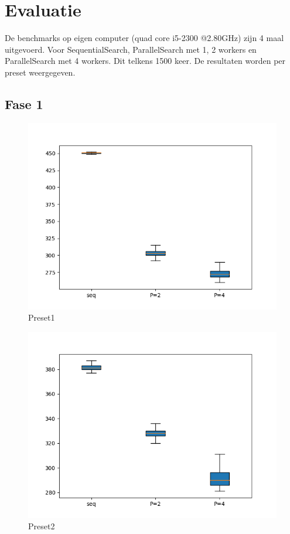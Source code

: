 \documentclass[]{article}
\begin{document}
\section{Evaluatie}
De benchmarks op eigen computer (quad core i5-2300 @2.80GHz) zijn 4 maal uitgevoerd. Voor SequentialSearch, ParallelSearch met 1, 2 workers en ParallelSearch met 4 workers. Dit telkens 1500 keer. De resultaten worden per preset weergegeven.

\subsection{Fase 1}

\begin{figure}
	\centering
	\includegraphics[width=0.7\linewidth]{Preset_1}
	\caption[Preset1]{Preset1}
	\label{fig:preset1}
\end{figure}

\begin{figure}
	\centering
	\includegraphics[width=0.7\linewidth]{Preset_2}
	\caption[Preset1]{Preset2}
	\label{fig:preset2}
\end{figure}
\end{document}
